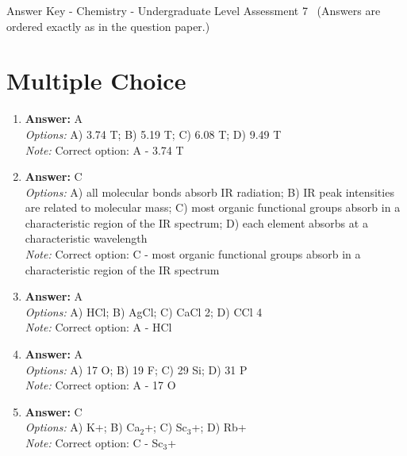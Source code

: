 \documentclass[12pt]{article}
\begin{document}
\begin{center}
Answer Key - Chemistry - Undergraduate Level Assessment 7 \
\small (Answers are ordered exactly as in the question paper.)
\end{center}

\section*{Multiple Choice}
\begin{enumerate}[label=\arabic*.]
\item \textbf{Answer:} A
\\ \textit{Options:} A) 3.74 T; B) 5.19 T; C) 6.08 T; D) 9.49 T
\\ \textit{Note:} Correct option: A - 3.74 T
\item \textbf{Answer:} C
\\ \textit{Options:} A) all molecular bonds absorb IR radiation; B) IR peak intensities are related to molecular mass; C) most organic functional groups absorb in a characteristic region of the IR spectrum; D) each element absorbs at a characteristic wavelength
\\ \textit{Note:} Correct option: C - most organic functional groups absorb in a characteristic region of the IR spectrum
\item \textbf{Answer:} A
\\ \textit{Options:} A) HCl; B) AgCl; C) CaCl 2; D) CCl 4
\\ \textit{Note:} Correct option: A - HCl
\item \textbf{Answer:} A
\\ \textit{Options:} A) 17 O; B) 19 F; C) 29 Si; D) 31 P
\\ \textit{Note:} Correct option: A - 17 O
\item \textbf{Answer:} C
\\ \textit{Options:} A) K+; B) Ca$_{2}$+; C) Sc$_{3}$+; D) Rb+
\\ \textit{Note:} Correct option: C - Sc$_{3}$+
\end{enumerate}
\end{document}
